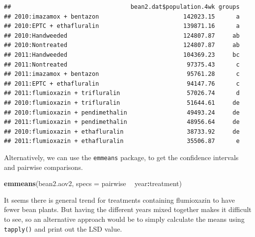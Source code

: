 \documentclass[letterpaper,]{book}
\newenvironment{Shaded}{\begin{snugshade}}{\end{snugshade}}
\newcommand{\DataTypeTok}[1]{\textcolor[rgb]{0.13,0.29,0.53}{#1}}
\newcommand{\DecValTok}[1]{\textcolor[rgb]{0.00,0.00,0.81}{#1}}
\newcommand{\FloatTok}[1]{\textcolor[rgb]{0.00,0.00,0.81}{#1}}
\newcommand{\KeywordTok}[1]{\textcolor[rgb]{0.13,0.29,0.53}{\textbf{#1}}}
\newcommand{\NormalTok}[1]{#1}
\newcommand{\OperatorTok}[1]{\textcolor[rgb]{0.81,0.36,0.00}{\textbf{#1}}}
\newcommand{\StringTok}[1]{\textcolor[rgb]{0.31,0.60,0.02}{#1}}
\begin{document}
\begin{verbatim}
##                                  bean2.dat$population.4wk groups
## 2010:imazamox + bentazon                        142023.15      a
## 2010:EPTC + ethafluralin                        139871.16      a
## 2010:Handweeded                                 124807.87     ab
## 2010:Nontreated                                 124807.87     ab
## 2011:Handweeded                                 104369.23     bc
## 2011:Nontreated                                  97375.43      c
## 2011:imazamox + bentazon                         95761.28      c
## 2011:EPTC + ethafluralin                         94147.76      c
## 2011:flumioxazin + trifluralin                   57026.74      d
## 2010:flumioxazin + trifluralin                   51644.61     de
## 2010:flumioxazin + pendimethalin                 49493.24     de
## 2011:flumioxazin + pendimethalin                 48956.64     de
## 2010:flumioxazin + ethafluralin                  38733.92     de
## 2011:flumioxazin + ethafluralin                  35506.87      e
\end{verbatim}

Alternatively, we can use the \texttt{emmeans} package, to get the confidence intervals and pairwise comparisons.

\begin{Shaded}
\begin{Highlighting}[]
\KeywordTok{emmeans}\NormalTok{(bean2.aov2, }\DataTypeTok{specs =}\NormalTok{ pairwise }\OperatorTok{~}\StringTok{ }\NormalTok{year}\OperatorTok{:}\NormalTok{treatment)}
\end{Highlighting}
\end{Shaded}

It seems there is general trend for treatments containing flumioxazin to have fewer bean plants. But having the different years mixed together makes it difficult to see, so an alternative approach would be to simply calculate the means using \texttt{tapply()} and print out the LSD value.

\begin{Shaded}
\end{Shaded}
\end{document}
